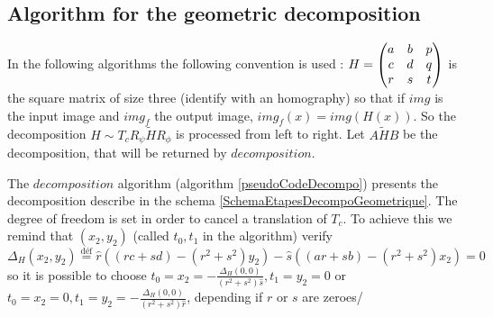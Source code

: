 \subsection{Algorithm for the geometric decomposition}
 
 In the following algorithms the following convention is used : $H = \begin{pmatrix} a&b&p\\c&d&q\\r&s&t \end{pmatrix}$ is the square matrix of size three (identify with an homography) so that if $img$ is the input image and $img_f$ the output image, $img_f(x) = img(H(x))$. So the decomposition $H \sim T_{c} R_{\psi}  \tilde H R_{\phi}$ is processed from left to right. Let $A \tilde H B$ be the decomposition, that will be returned by $decomposition$. 
 
 
 The $decomposition$ algorithm (algorithm \ref{pseudoCodeDecompo}) presents the decomposition describe in the schema \ref{SchemaEtapesDecompoGeometrique}. The degree of freedom is set in order to cancel a translation of $T_c$. To achieve this we remind that $(x_2,y_2)$ (called $t_0,t_1$ in the algorithm) verify
 \[\Delta_H(x_2 , y_2 ) \stackrel{\text{déf}}{=} \hat r ((rc+sd)-(r^2 + s^2)y_2) - \hat s ((ar+sb)-(r^2 + s^2 )x_2) = 0 \]
 so it is possible to choose $t_0 = x_2 = -\frac{\Delta_H(0,0)}{(r^2+s^2)\hat s}, t_1 = y_2 = 0$ or $t_0 = x_2 = 0, t_1 = y_2 = -\frac{\Delta_H(0,0)}{(r^2+s^2)\hat r}$, depending if $r$ or $s$ are zeroes/
 
 

